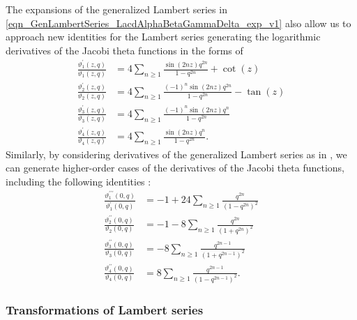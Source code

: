 \documentclass[10pt,reqno]{amsart}
\numberwithin{figure}{section}
\numberwithin{table}{section}
\theoremstyle{plain}
\numberwithin{theorem}{section}
\theoremstyle{remark}
\begin{document}
The expansions of the generalized Lambert series in 
\eqref{eqn_GenLambertSeries_LacdAlphaBetaGammaDelta_exp_v1} also allow us to approach new identities for the 
Lambert series generating the logarithmic derivatives of the Jacobi theta functions in the forms of 
\cite[\S 20.5(ii)]{NISTHB} 
\begin{align*} 
\frac{\vartheta_1^{\prime}(z, q)}{\vartheta_1(z, q)} & = 
     4 \sum_{n \geq 1} \frac{\sin(2nz) q^{2n}}{1-q^{2n}} + \cot(z) \\ 
\frac{\vartheta_2^{\prime}(z, q)}{\vartheta_2(z, q)} & = 
     4 \sum_{n \geq 1} \frac{(-1)^n \sin(2nz) q^{2n}}{1-q^{2n}} -\tan(z) \\ 
\frac{\vartheta_3^{\prime}(z, q)}{\vartheta_3(z, q)} & = 
     4 \sum_{n \geq 1} \frac{(-1)^n \sin(2nz) q^{n}}{1-q^{2n}} \\ 
\frac{\vartheta_4^{\prime}(z, q)}{\vartheta_4(z, q)} & = 
     4 \sum_{n \geq 1} \frac{\sin(2nz) q^{n}}{1-q^{2n}}. 
\end{align*} 
Similarly, by considering derivatives of the generalized Lambert series as in 
\cite{SCHMIDT-COMBSUMSBDDDIV}, we can generate higher-order cases of the 
derivatives of the Jacobi theta functions, including the following identities 
\cite[\S 20.4(ii)]{NISTHB}: 
\begin{align*} 
\frac{\vartheta_1^{\prime\prime\prime}(0, q)}{\vartheta_1^{\prime}(0, q)} & = 
     -1 + 24 \sum_{n \geq 1} \frac{q^{2n}}{(1-q^{2n})^2} \\ 
\frac{\vartheta_2^{\prime\prime}(0, q)}{\vartheta_2(0, q)} & = 
     -1 - 8 \sum_{n \geq 1} \frac{q^{2n}}{(1+q^{2n})^2} \\ 
\frac{\vartheta_3^{\prime\prime}(0, q)}{\vartheta_3(0, q)} & = 
     - 8 \sum_{n \geq 1} \frac{q^{2n-1}}{(1+q^{2n-1})^2} \\ 
\frac{\vartheta_4^{\prime\prime}(0, q)}{\vartheta_4(0, q)} & = 
     8 \sum_{n \geq 1} \frac{q^{2n-1}}{(1-q^{2n-1})^2}. 
\end{align*} 

\subsubsection{Transformations of Lambert series} 
\end{document}
